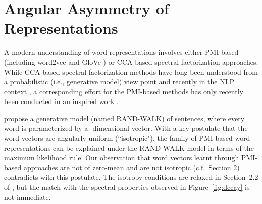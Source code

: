 \documentclass{article} \usepackage{acl2017,times}
\begin{document}
\appendix


\section{Angular Asymmetry of Representations} 
\label{app:angular}
A modern understanding of word representations involves either PMI-based  (including word2vec \citep{mikolov2010recurrent,levy2014neural} and GloVe \citep{pennington2014glove}) or CCA-based  spectral factorization approaches. While CCA-based spectral factorization methods have long been understood from  a probabilistic (i.e., generative model) view point  \citep{browne1979maximum,hotelling1936relations} and   recently in the NLP context  \citep{stratos2015model},  a  corresponding  effort for the PMI-based methods has only recently been conducted in an inspired work   \citep{arora2015rand}. 

\citep{arora2015rand}  propose a generative model (named RAND-WALK) of sentences, where  every word is parameterized by a -dimensional vector. With a key postulate that the word vectors are angularly uniform   (``isotropic"), the family of PMI-based word representations can be explained under the RAND-WALK model in terms of the maximum likelihood rule.  
Our observation that word vectors learnt through PMI-based approaches are not of zero-mean and are not isotropic (c.f.\ Section 2) contradicts with this postulate. The isotropy conditions  are  relaxed in Section~2.2  of \citep{arora2015rand}, but the match with the spectral properties observed in Figure~\ref{fig:decay} is not immediate.  
\end{document}
